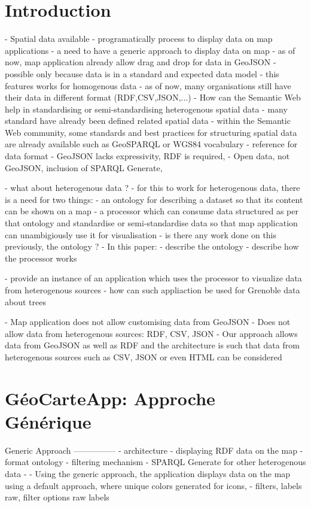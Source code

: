 \documentclass[a4paper,pagenum,english]{rnti}
\affiliation{
    \affil{1}Univ Lyon, MINES Saint-\'Etienne, CNRS, Laboratoire Hubert Curien UMR 5516, \\F-42023 Saint-\'Etienne, France\\
          \{prenom.nom\}@emse.fr\\
    \affil{2}Mondeca, \\ 35 boulevard Strasbourg, Paris, France\\
          ghislain.atemezing@mondeca.com\\
 }
\begin{document}
%
\section{Introduction}
- Spatial data available
- programatically process to display data on map applications
- a need to have a generic approach to display data on map
- as of now, map application already allow drag and drop for data in GeoJSON
- possible only because data is in a standard and expected data model
- this features works for homogenous data
- as of now, many organisations still have their data in different format (RDF,CSV,JSON,...)
- How can the Semantic Web help in standardising or semi-standardising heterogenous spatial data
	- many standard have already been defined related spatial data
		- within the Semantic Web community, some standards and best practices for structuring spatial data are already available such as GeoSPARQL or WGS84 vocabulary 
- reference for data format %
- GeoJSON lacks expressivity, RDF is required,
- Open data, not GeoJSON, inclusion of SPARQL Generate,

- what about heterogenous data ?
- for this to work for heterogenous data, there is a need for two things:
	- an ontology for describing a dataset so that its content can be shown on a map
	- a processor which can consume data structured as per that ontology and standardise or semi-standardise 
	data so that map application can unambigiously use it for visualisation
- is there any work done on this previously, the ontology ?
- In this paper:
	- describe the ontology 
	- describe how the processor works
	
	- provide an instance of an application which uses the processor to visualize data from heterogenous sources
	- how can such appliaction be used for Grenoble data about trees

- Map application does not allow customising data from GeoJSON
- Does not allow data from heterogenous sources: RDF, CSV, JSON
- Our approach allows data from GeoJSON as well as RDF and the architecture is such that data from heterogenous sources such as CSV, JSON or even HTML can be considered
\section{GéoCarteApp: Approche Générique}
Generic Approach
---------------
- architecture
- displaying RDF data on the map
- format ontology
- filtering mechanism
- SPARQL Generate for other heterogenous data
- - Using the generic approach, the application displays data on the map using a default approach, where unique colors generated for icons,
- filters, labels raw, filter options raw labels
\end{document}

